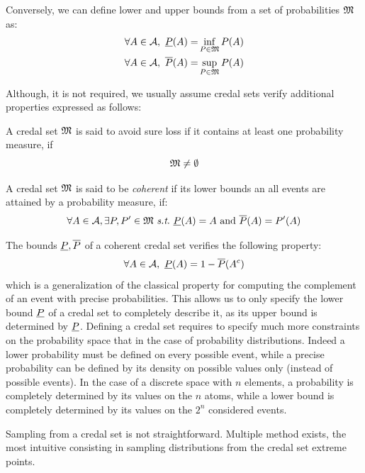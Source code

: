 Conversely, we can define lower and upper bounds from a set of probabilities ${\mathfrak{M}}$ as:
\begin{align*}
    \forall A\in\mathcal{A},~{\underline{P}}(A) =& \inf_{P\in{\mathfrak{M}}}P(A)\\
    \forall A\in\mathcal{A},~\overline{P}(A) =& \sup_{P\in{\mathfrak{M}}}P(A)
\end{align*}

Although, it is not required, we usually assume credal sets verify additional properties expressed as follows:
\begin{definition}\label{def:coherence_sure_loss}
    A credal set ${\mathfrak{M}}$ is said to avoid sure loss if it contains at least one probability measure, \ie if
    \begin{equation}
        {\mathfrak{M}} \neq \emptyset\label{eq:avoid_sure_loss}
    \end{equation}
    
    A credal set ${\mathfrak{M}}$ is said to be \textit{coherent} if its lower bounds an all events are attained by a probability measure, \ie if:
    \begin{equation}
        \forall A\in\mathcal{A}, \exists P, P'\in\M~\st~\low(A)=A \text{ and } \overline{P}(A)=P'(A) 
    \end{equation}
\end{definition}
The bounds ${\underline{P}}, \overline{P}$ of a coherent credal set verifies the following property:
\begin{equation}
    \forall A\in\mathcal{A}, ~{\underline{P}}(A) = 1 - \overline{P}(A^c)\label{eq:lower_proba_complement}
\end{equation}
which is a generalization of the classical property for computing the complement of an event with precise probabilities. This allows us to only specify the lower bound ${\underline{P}}$ of a credal set to completely describe it, as its upper bound is determined by ${\underline{P}}$. Defining a credal set requires to specify much more constraints on the probability space that in the case of probability distributions. Indeed a lower probability must be defined on every possible event, while a precise probability can be defined by its density on possible values only (instead of possible events). In the case of a discrete space with $n$ elements, a probability is completely determined by its values on the $n$ atoms, while a lower bound is completely determined by its values on the $2^n$ considered events.


\begin{remark}
    Sampling from a credal set is not straightforward. Multiple method exists, the most intuitive consisting in sampling distributions from the credal set extreme points.
\end{remark}

